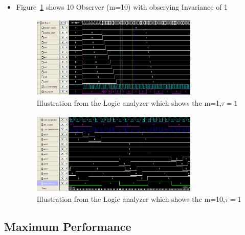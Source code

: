\begin{itemize}
\item Figure~\ref{fig:logicanalyzer:m10:t1:1} shows 10 Observer (m=10) with observing Invariance of 1\\

\begin{figure}[]
\centering
\includegraphics[width=300px,height=150px]{../../pictures/Logicanalyzer/10_Observer_Tau_1_2.png}
\caption[Logicanalyzer m=10,$\tau=1$]{Illustration from the Logic analyzer which shows the m=1,$\tau = 1$}
\label{fig:logicanalyzer:m10:t1:1}
\end{figure}


\begin{figure}[]
\centering
\includegraphics[width=300px,height=150px]{../../pictures/Logicanalyzer/10_Observer_Tau_1_1.png}
\caption[Logicanalyzer m=10,$\tau=1$]{Illustration from the Logic analyzer which shows the m=10,$\tau = 1$}
\label{fig:logicanalyzer:m10:t1:2}
\end{figure}

\end{itemize}

\subsection{Maximum Performance}
